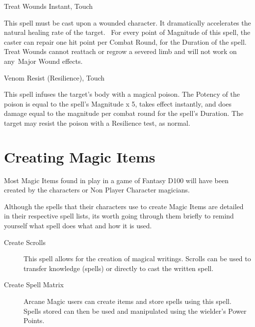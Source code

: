 

\begin{rpg-spell}
{Treat Wounds}
{Instant, Touch}

This spell must be cast upon a wounded character. It dramatically accelerates the natural healing rate of the target.  For every point of Magnitude of this spell, the caster can repair one hit point per Combat Round, for the Duration of the spell. Treat Wounds cannot reattach or regrow a severed limb and will not work on any Major Wound effects. 
\end{rpg-spell}


\begin{rpg-spell}
{Venom}
{Resist (Resilience), Touch}

This spell infuses the target’s body with a magical poison. The Potency of the poison is equal to the spell’s Magnitude x 5, takes effect instantly, and does damage equal to the magnitude per combat round for the spell’s Duration. The target may resist the poison with a Resilience test, as normal.
\end{rpg-spell}


\section{Creating Magic Items}
Most Magic Items found in play in a game of Fantasy D100 will have been created by the characters or Non Player Character magicians.

Although the spells that their characters use to create Magic Items are detailed in their respective spell lists, its worth going through them briefly to remind yourself what spell does what and how it is used.

\begin{description}
\item [Create Scrolls] This spell allows for the creation of magical writings. Scrolls can be used to transfer knowledge (spells) or directly to cast the written spell.
\item [Create Spell Matrix] Arcane Magic users can create items and store spells using this spell. Spells stored can then be used and manipulated using the wielder's Power Points.
\end{description}

